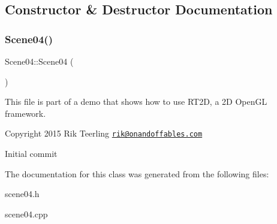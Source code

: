 \subsection{Constructor \& Destructor Documentation}
\mbox{\label{class_scene04_acc9abfd3e2a3bd624ca980ac0589e48d}} 
\subsubsection{\texorpdfstring{Scene04()}{Scene04()}}
{\footnotesize\ttfamily Scene04\+::\+Scene04 (\begin{DoxyParamCaption}{ }\end{DoxyParamCaption})}

This file is part of a demo that shows how to use R\+T2D, a 2D Open\+GL framework.


\begin{DoxyItemize}
\item Copyright 2015 Rik Teerling \href{mailto:rik@onandoffables.com}{\tt rik@onandoffables.\+com}
\begin{DoxyItemize}
\item Initial commit 
\end{DoxyItemize}
\end{DoxyItemize}

The documentation for this class was generated from the following files\+:\begin{DoxyCompactItemize}
\item 
scene04.\+h\item 
scene04.\+cpp\end{DoxyCompactItemize}
